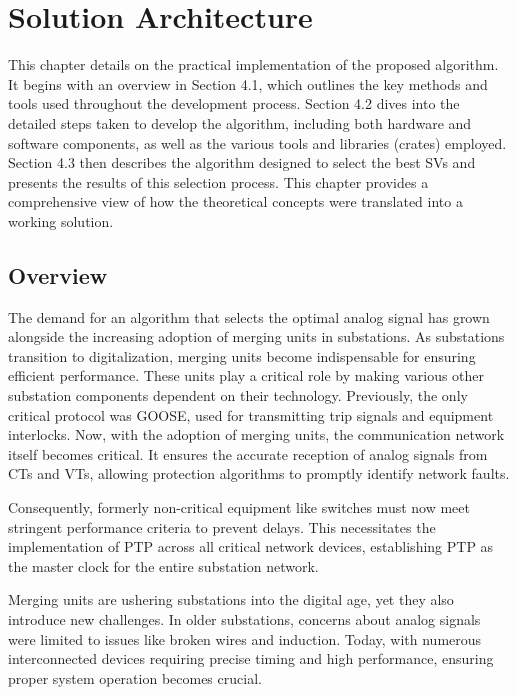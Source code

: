 
\chapter{Solution Architecture} %

\label{chap:Chapter4} %


This chapter details on the practical implementation of the proposed algorithm. It begins with an overview in Section 4.1, which outlines the key methods and tools used throughout the development process. Section 4.2 dives into the detailed steps taken to develop the algorithm, including both hardware and software components, as well as the various tools and libraries (crates) employed. Section 4.3 then describes the algorithm designed to select the best SVs and presents the results of this selection process. This chapter provides a comprehensive view of how the theoretical concepts were translated into a working solution.

\section{Overview}

The demand for an algorithm that selects the optimal analog signal has grown alongside the increasing adoption of merging units in substations. As substations transition to digitalization, merging units become indispensable for ensuring efficient performance. These units play a critical role by making various other substation components dependent on their technology. Previously, the only critical protocol was GOOSE, used for transmitting trip signals and equipment interlocks. Now, with the adoption of merging units, the communication network itself becomes critical. It ensures the accurate reception of analog signals from CTs and VTs, allowing protection algorithms to promptly identify network faults.

Consequently, formerly non-critical equipment like switches must now meet stringent performance criteria to prevent delays. This necessitates the implementation of PTP across all critical network devices, establishing PTP as the master clock for the entire substation network.

Merging units are ushering substations into the digital age, yet they also introduce new challenges. In older substations, concerns about analog signals were limited to issues like broken wires and induction. Today, with numerous interconnected devices requiring precise timing and high performance, ensuring proper system operation becomes crucial.


